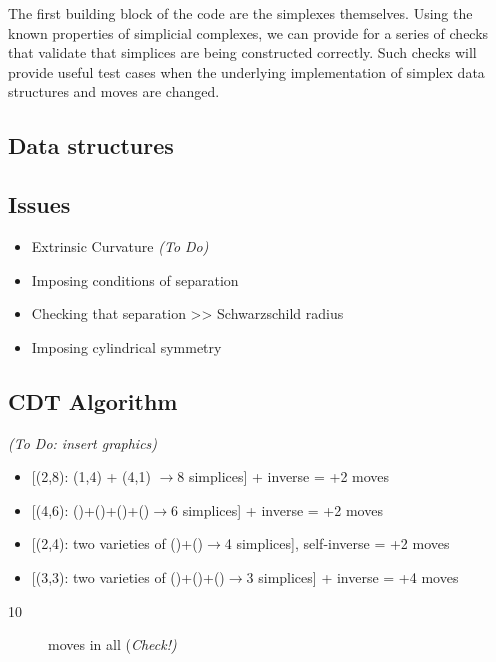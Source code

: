\documentclass{article}
\begin{document}
The first building block of the code are the simplexes themselves. Using the known properties of simplicial complexes, we can provide for a series of checks that validate that simplices are being constructed correctly. Such checks will provide useful test cases when the underlying implementation of simplex data structures and moves are changed.

\subsection{Data structures}

\subsection{Issues}

\begin{itemize}
\item Extrinsic Curvature \emph{(To Do)}
\item Imposing conditions of separation
\item Checking that separation >\textcompwordmark{}> Schwarzschild radius
\item Imposing cylindrical symmetry
\end{itemize}

\subsection{CDT Algorithm}

\emph{(To Do: insert graphics)}

\begin{itemize}
\item {[}(2,8): (1,4) + (4,1) $\rightarrow$8 simplices{]} + inverse = +2
moves
\item {[}(4,6): ()+()+()+()$\rightarrow$6 simplices{]} + inverse = +2 moves
\item {[}(2,4): two varieties of ()+()$\rightarrow$4 simplices{]}, self-inverse
= +2 moves
\item {[}(3,3): two varieties of ()+()+()$\rightarrow$3 simplices{]} +
inverse = +4 moves\end{itemize}
\begin{description}
\item [{10}] moves in all (\emph{Check!)}
\end{description}
\end{document}
